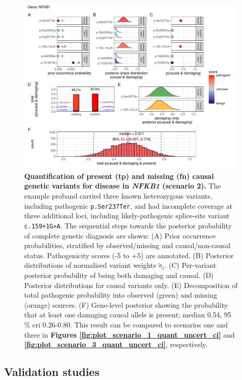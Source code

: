 \begin{figure}[ht]
  \centering
  \includegraphics[width=0.99\textwidth]{../images/plot_scenario_2_quant_uncert_ci.pdf}
  \caption{
    \textbf{Quantification of present (\ac{tp}) and missing (\ac{fn}) causal genetic variants for disease in \textit{NFKB1} (scenario 2).}
    The example proband carried three known heterozygous variants, including pathogenic \texttt{p.Ser237Ter}, and had incomplete coverage at three additional loci, including likely-pathogenic splice-site variant \texttt{c.159+1G{\small\textgreater}A}.  The sequential steps towards the posterior  probability of complete genetic diagnosis are shown:
    (A) Prior occurrence probabilities, stratified by observed/missing and causal/non-causal status. Pathogenicity scores (-5 to +5) are annotated.
    (B) Posterior distributions of normalised variant weights \(\tilde{\pi}_i\).  
    (C) Per-variant posterior probability of being both damaging and causal.  
    (D) Posterior distributions for causal variants only.  
    (E) Decomposition of total pathogenic probability into observed (green) and missing (orange) sources.  
    (F) Gene-level posterior showing the probability that at least one damaging causal allele is present; median 0.54, 95\,\% \ac{cri} 0.26-0.80. This result can be compared to scenarios one and three in 
    \textbf{Figures \ref{fig:plot_scenario_1_quant_uncert_ci}} and
    \textbf{\ref{fig:plot_scenario_3_quant_uncert_ci}}, respectively.
  }
  \label{fig:plot_scenario_2_quant_uncert_ci}
\end{figure}

\FloatBarrier
\subsection{Validation studies}

